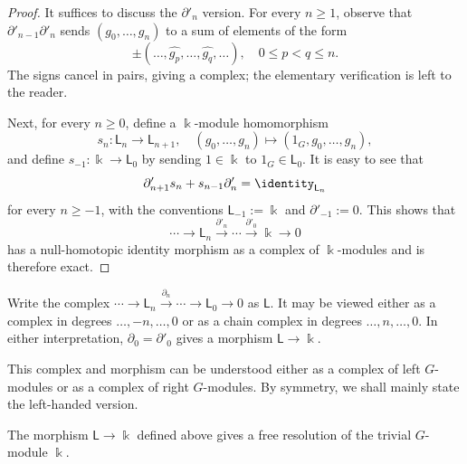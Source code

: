 \begin{proof}
	It suffices to discuss the $\partial'_n$ version. For every $n\geq1$,
	observe that $\partial'_{n-1}\partial'_n$ sends $(g_0,\ldots,g_n)$ to a
	sum of elements of the form
	\[ \pm (\ldots, \widehat{g_p}, \ldots, \widehat{g_q}, \ldots), \quad 0 \leq p < q \leq n. \]
	The signs cancel in pairs, giving a complex; the elementary verification is
	left to the reader.

	Next, for every $n\geq0$, define a $\Bbbk$-module homomorphism
	\[ s_n: \mathsf{L}_n \to \mathsf{L}_{n+1}, \quad (g_0, \ldots, g_n) \mapsto (1_G, g_0, \ldots, g_n), \]
	and define $s_{-1}:\Bbbk\to\mathsf{L}_0$ by sending $1\in\Bbbk$ to
	$1_G\in\mathsf{L}_0$. It is easy to see that
	\[ \partial'_{n+1} s_n + s_{n-1} \partial'_n = \identity_{\mathsf{L}_n} \]
	for every $n\geq-1$, with the conventions $\mathsf{L}_{-1}:=\Bbbk$ and
	$\partial'_{-1}:=0$. This shows that
	\[ \cdots \to \mathsf{L}_n \xrightarrow{\partial'_n} \cdots \xrightarrow{\partial'_0} \Bbbk \to 0 \]
	has a null-homotopic identity morphism as a complex of $\Bbbk$-modules and
	is therefore exact.
\end{proof}


Write the complex
$\cdots\to\mathsf{L}_n\xrightarrow{\partial_n}\cdots\to\mathsf{L}_0\to0$
as $\mathsf{L}$. It may be viewed either as a complex in degrees
$\ldots,-n,\ldots,0$ or as a chain complex in degrees
$\ldots,n,\ldots,0$. In either interpretation, $\partial_0=\partial'_0$
gives a morphism $\mathsf{L}\to\Bbbk$.

This complex and morphism can be understood either as a complex of left
$G$-modules or as a complex of right $G$-modules. By symmetry, we shall mainly
state the left-handed version.

\begin{proposition}\label{prop:trivial-mod-resolution}
	The morphism $\mathsf{L}\to\Bbbk$ defined above gives a free resolution of
	the trivial $G$-module $\Bbbk$.
\end{proposition}

